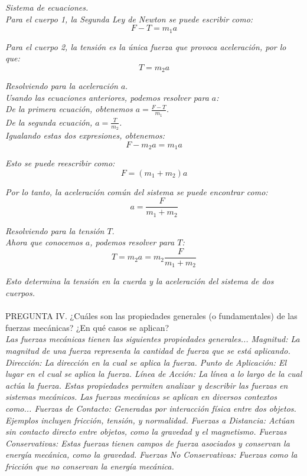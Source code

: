 \documentclass{article}
\begin{document}
\textit{Sistema de ecuaciones.}\\
\textit{Para el cuerpo 1, la Segunda Ley de Newton se puede escribir como:} \\ 
\[
F - T = m_1  a
\]

\textit{Para el cuerpo 2, la tensión es la única fuerza que provoca aceleración, por lo que:} \\ 
\[
T = m_2  a
\]

\textit{Resolviendo para la aceleración \(a\)}.\\
\textit{Usando las ecuaciones anteriores, podemos resolver para \(a\):} \\
\textit{De la primera ecuación, obtenemos \(a = \frac{F - T}{m_1}\).} \\ 
\textit{De la segunda ecuación, \(a = \frac{T}{m_2}\).} \\

\textit{Igualando estas dos expresiones, obtenemos:} \\ 
\[
F - m_2  a = m_1  a
\]

\textit{Esto se puede reescribir como:} \\ 
\[
F = (m_1 + m_2)  a
\]

\textit{Por lo tanto, la aceleración común del sistema se puede encontrar como:} \\ 
\[
a = \frac{F}{m_1 + m_2}
\]

\textit{Resolviendo para la tensión \(T\)}.\\
\textit{Ahora que conocemos \(a\), podemos resolver para \(T\):} \\
\[
T = m_2  a = m_2  \frac{F}{m_1 + m_2}
\]

\textit{Esto determina la tensión en la cuerda y la aceleración del sistema de dos cuerpos.}\\\\
 
 
PREGUNTA IV. ¿Cuáles son las propiedades generales (o 
 fundamentales) de las fuerzas mecánicas? ¿En qué casos se aplican?\\
 \textit{Las fuerzas mecánicas tienen las siguientes propiedades generales... Magnitud: La magnitud de una fuerza representa la cantidad de fuerza que se está aplicando. Dirección: La dirección en la cual se aplica la fuerza. Punto de Aplicación: El lugar en el cual se aplica la fuerza. Línea de Acción: La línea a lo largo de la cual actúa la fuerza. Estas propiedades permiten analizar y describir las fuerzas en sistemas mecánicos. Las fuerzas mecánicas se aplican en diversos contextos como... Fuerzas de Contacto: Generadas por interacción física entre dos objetos. Ejemplos incluyen fricción, tensión, y normalidad. Fuerzas a Distancia: Actúan sin contacto directo entre objetos, como la gravedad y el magnetismo. Fuerzas Conservativas: Estas fuerzas tienen campos de fuerza asociados y conservan la energía mecánica, como la gravedad. Fuerzas No Conservativas: Fuerzas como la fricción que no conservan la energía mecánica.}
\end{document}
